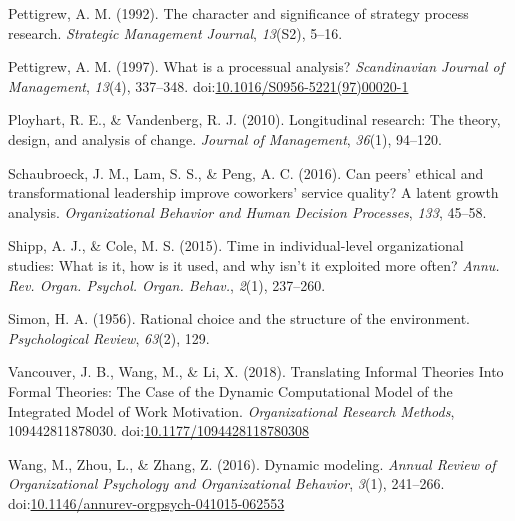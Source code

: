 \documentclass[english,,man]{apa6}
\theoremstyle{definition}
\theoremstyle{definition}
\theoremstyle{definition}
\theoremstyle{remark}
\begin{document}
\leavevmode\hypertarget{ref-pettigrew_character_1992}{}%
Pettigrew, A. M. (1992). The character and significance of strategy
process research. \emph{Strategic Management Journal}, \emph{13}(S2),
5--16.

\leavevmode\hypertarget{ref-pettigrew_what_1997-1}{}%
Pettigrew, A. M. (1997). What is a processual analysis?
\emph{Scandinavian Journal of Management}, \emph{13}(4), 337--348.
doi:\href{https://doi.org/10.1016/S0956-5221(97)00020-1}{10.1016/S0956-5221(97)00020-1}

\leavevmode\hypertarget{ref-ployhart_longitudinal_2010}{}%
Ployhart, R. E., \& Vandenberg, R. J. (2010). Longitudinal research: The
theory, design, and analysis of change. \emph{Journal of Management},
\emph{36}(1), 94--120.

\leavevmode\hypertarget{ref-schaubroeck_can_2016}{}%
Schaubroeck, J. M., Lam, S. S., \& Peng, A. C. (2016). Can peers'
ethical and transformational leadership improve coworkers' service
quality? A latent growth analysis. \emph{Organizational Behavior and
Human Decision Processes}, \emph{133}, 45--58.

\leavevmode\hypertarget{ref-shipp_time_2015}{}%
Shipp, A. J., \& Cole, M. S. (2015). Time in individual-level
organizational studies: What is it, how is it used, and why isn't it
exploited more often? \emph{Annu. Rev. Organ. Psychol. Organ. Behav.},
\emph{2}(1), 237--260.

\leavevmode\hypertarget{ref-simon1956rational}{}%
Simon, H. A. (1956). Rational choice and the structure of the
environment. \emph{Psychological Review}, \emph{63}(2), 129.

\leavevmode\hypertarget{ref-vancouver_translating_2018}{}%
Vancouver, J. B., Wang, M., \& Li, X. (2018). Translating Informal
Theories Into Formal Theories: The Case of the Dynamic Computational
Model of the Integrated Model of Work Motivation. \emph{Organizational
Research Methods}, 109442811878030.
doi:\href{https://doi.org/10.1177/1094428118780308}{10.1177/1094428118780308}

\leavevmode\hypertarget{ref-Wang2016}{}%
Wang, M., Zhou, L., \& Zhang, Z. (2016). Dynamic modeling. \emph{Annual
Review of Organizational Psychology and Organizational Behavior},
\emph{3}(1), 241--266.
doi:\href{https://doi.org/10.1146/annurev-orgpsych-041015-062553}{10.1146/annurev-orgpsych-041015-062553}
\end{document}
